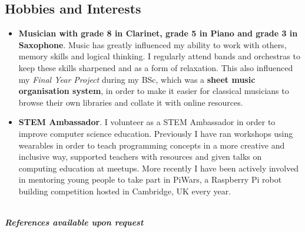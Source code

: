\documentclass{article}
\begin{document}
\begin{flushleft}
\section*{Hobbies and Interests}
\begin{itemize}
\item \textbf{Musician with grade 8 in Clarinet, grade 5 in Piano and grade 3 in Saxophone}. Music has greatly influenced my ability to work with others, memory skills and logical thinking. I regularly attend bands and orchestras to keep these skills sharpened and as a form of relaxation. This also influenced my \textit{Final Year Project} during my BSc, which was a \textbf{sheet music organisation system}, in order to make it easier for classical musicians to browse their own libraries and collate it with online resources. 

\item \textbf{STEM Ambassador}. I volunteer as a STEM Ambassador in order to improve computer science education. Previously I have ran workshops using wearables in order to teach programming concepts in a more creative and inclusive way, supported teachers with resources and given talks on computing education at meetups. More recently I have been actively involved in mentoring young people to take part in PiWars, a Raspberry Pi robot building competition hosted in Cambridge, UK every year.
\end{itemize}
\end{flushleft}\\[15pt]

\textbf{\textit{References available upon request}}
\end{document}
